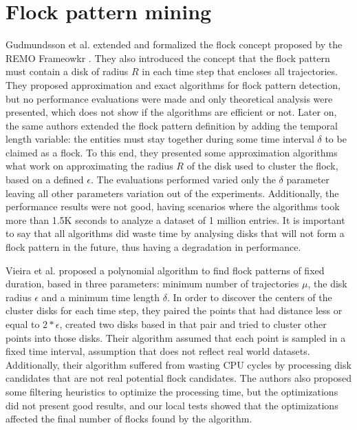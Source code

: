 \section{Flock pattern mining}
\label{sec:rel_flock}
Gudmundsson et al. \citep{gudefficient} \citep{gudlongest} extended and formalized the flock concept proposed by the
REMO Frameowkr \citep{remo}. They also introduced the concept that the flock pattern must contain a disk of radius $R$
in each time step that encloses all trajectories. They proposed approximation and exact algorithms for flock pattern
detection, but no performance evaluations were made and only theoretical analysis were presented, which does not show if
the algorithms are efficient or not. Later on, the same authors \citep{gudlongest} extended the flock pattern definition
by adding the temporal length variable: the entities must stay together during some time interval $\delta$ to be claimed
as a flock. To this end, they presented some approximation algorithms what work on approximating the radius $R$ of the
disk used to cluster the flock, based on a defined $\epsilon$. The evaluations performed \citep{gudlongest} varied only
the $\delta$ parameter leaving all other parameters variation out of the experiments. Additionally, the performance
results were not good, having scenarios where the algorithms took more than 1.5K seconds to analyze a dataset of 1
million entries. It is important to say that all algorithms did waste time by analysing disks that will not form a flock
pattern in the future, thus having a degradation in performance.

Vieira et al. \citep{vieira} proposed a polynomial algorithm to find flock patterns of fixed duration, based in three
parameters: minimum number of trajectories $\mu$, the disk radius $\epsilon$ and a minimum time length $\delta$.  In
order to discover the centers of the cluster disks for each time step, they paired the points that had distance less or
equal to $2*\epsilon$, created two disks based in that pair and tried to cluster other points into those disks. Their
algorithm assumed that each point is sampled in a fixed time interval, assumption that does not reflect real world
datasets. Additionally, their algorithm suffered from wasting CPU cycles by processing disk candidates that are not real
potential flock candidates. The authors also proposed some filtering heuristics to optimize the processing time, but the
optimizations did not present good results, and our local tests showed that the optimizations affected the final number
of flocks found by the algorithm.

